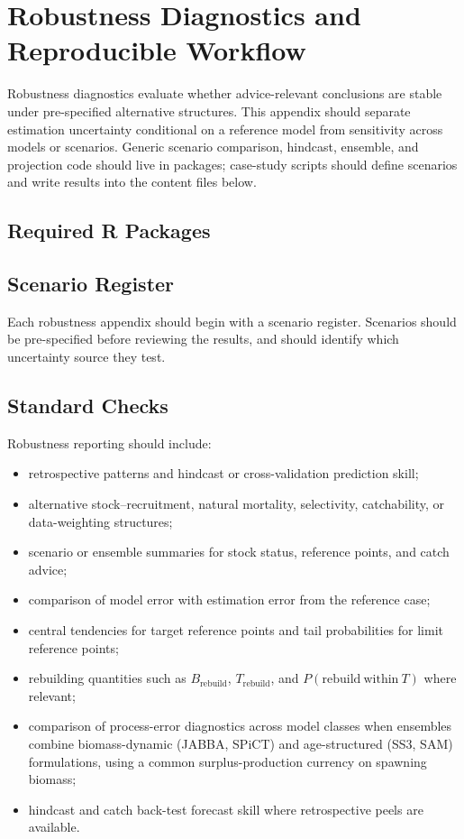 \section{Robustness Diagnostics and Reproducible Workflow}
\label{app:robustness}

Robustness diagnostics evaluate whether advice-relevant conclusions are stable under
pre-specified alternative structures. This appendix should separate estimation uncertainty
conditional on a reference model from sensitivity across models or scenarios. Generic
scenario comparison, hindcast, ensemble, and projection code should live in packages;
case-study scripts should define scenarios and write results into the content files below.

\subsection{Required R Packages}



\subsection{Scenario Register}

Each robustness appendix should begin with a scenario register. Scenarios should be
pre-specified before reviewing the results, and should identify which uncertainty source
they test.



\subsection{Standard Checks}

Robustness reporting should include:

\begin{itemize}
  \item retrospective patterns and hindcast or cross-validation prediction skill;
  \item alternative stock--recruitment, natural mortality, selectivity, catchability, or data-weighting structures;
  \item scenario or ensemble summaries for stock status, reference points, and catch advice;
  \item comparison of model error with estimation error from the reference case;
  \item central tendencies for target reference points and tail probabilities for limit reference points;
  \item rebuilding quantities such as $B_{\mathrm{rebuild}}$, $T_{\mathrm{rebuild}}$, and $P(\mathrm{rebuild\ within\ }T)$ where relevant;
  \item comparison of process-error diagnostics across model classes when ensembles combine biomass-dynamic (JABBA, SPiCT) and age-structured (SS3, SAM) formulations, using a common surplus-production currency on spawning biomass;
  \item hindcast and catch back-test forecast skill where retrospective peels are available.
\end{itemize}

